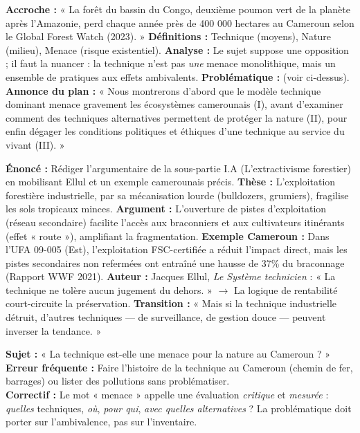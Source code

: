 \documentclass[11pt]{article}
\begin{document}
\begin{exemplebox}
\textbf{Accroche :} « La forêt du bassin du Congo, deuxième poumon vert de la planète après l'Amazonie, perd chaque année près de 400 000 hectares au Cameroun selon le Global Forest Watch (2023). »
\textbf{Définitions :} Technique (moyens), Nature (milieu), Menace (risque existentiel).
\textbf{Analyse :} Le sujet suppose une opposition ; il faut la nuancer : la technique n'est pas \emph{une} menace monolithique, mais un ensemble de pratiques aux effets ambivalents.
\textbf{Problématique :} (voir ci-dessus).
\textbf{Annonce du plan :} « Nous montrerons d'abord que le modèle technique dominant menace gravement les écosystèmes camerounais (I), avant d'examiner comment des techniques alternatives permettent de protéger la nature (II), pour enfin dégager les conditions politiques et éthiques d'une technique au service du vivant (III). »
\end{exemplebox}

\begin{exoresolu}
\textbf{Énoncé :} Rédiger l'argumentaire de la sous-partie I.A (L'extractivisme forestier) en mobilisant Ellul et un exemple camerounais précis.
\tcblower
\textbf{Thèse :} L'exploitation forestière industrielle, par sa mécanisation lourde (bulldozers, grumiers), fragilise les sols tropicaux minces.
\textbf{Argument :} L'ouverture de pistes d'exploitation (réseau secondaire) facilite l'accès aux braconniers et aux cultivateurs itinérants (effet « route »), amplifiant la fragmentation.
\textbf{Exemple Cameroun :} Dans l'UFA 09-005 (Est), l'exploitation FSC-certifiée a réduit l'impact direct, mais les pistes secondaires non refermées ont entraîné une hausse de 37\% du braconnage (Rapport WWF 2021).
\textbf{Auteur :} Jacques Ellul, \emph{Le Système technicien} : « La technique ne tolère aucun jugement du dehors. » $\rightarrow$ La logique de rentabilité court-circuite la préservation.
\textbf{Transition :} « Mais si la technique industrielle détruit, d'autres techniques — de surveillance, de gestion douce — peuvent inverser la tendance. »
\end{exoresolu}

\begin{attention}
\textbf{Sujet :} « La technique est-elle une menace pour la nature au Cameroun ? » \\
\textbf{Erreur fréquente :} Faire l'histoire de la technique au Cameroun (chemin de fer, barrages) ou lister des pollutions sans problématiser. \\
\textbf{Correctif :} Le mot « menace » appelle une évaluation \emph{critique} et \emph{mesurée} : \emph{quelles} techniques, \emph{où}, \emph{pour qui}, \emph{avec quelles alternatives} ? La problématique doit porter sur l'ambivalence, pas sur l'inventaire.
\end{attention}
\end{document}
